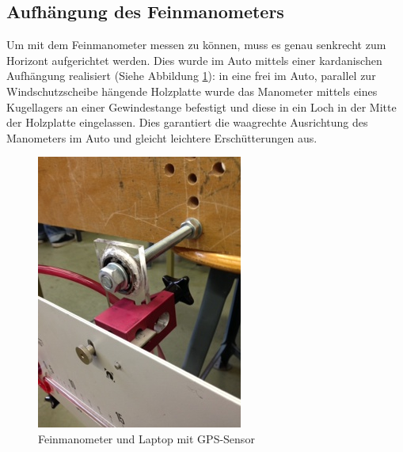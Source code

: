 \subsection{Aufhängung des Feinmanometers}
Um mit dem Feinmanometer messen zu können, muss es genau senkrecht zum Horizont aufgerichtet werden. Dies wurde im Auto mittels einer kardanischen Aufhängung realisiert (Siehe Abbildung \ref{aufhängung}): in eine frei im Auto, parallel zur Windschutzscheibe hängende Holzplatte wurde das Manometer mittels eines Kugellagers an einer Gewindestange befestigt und diese in ein Loch in der Mitte der Holzplatte eingelassen. Dies garantiert die waagrechte Ausrichtung des Manometers im Auto und gleicht leichtere Erschütterungen aus. 


\begin{figure}
\centering
	\includegraphics[width=.5\textwidth]{images/aufhaengung.JPG}
	\caption{Feinmanometer und Laptop mit GPS-Sensor}
	\label{aufhängung}
\end{figure}